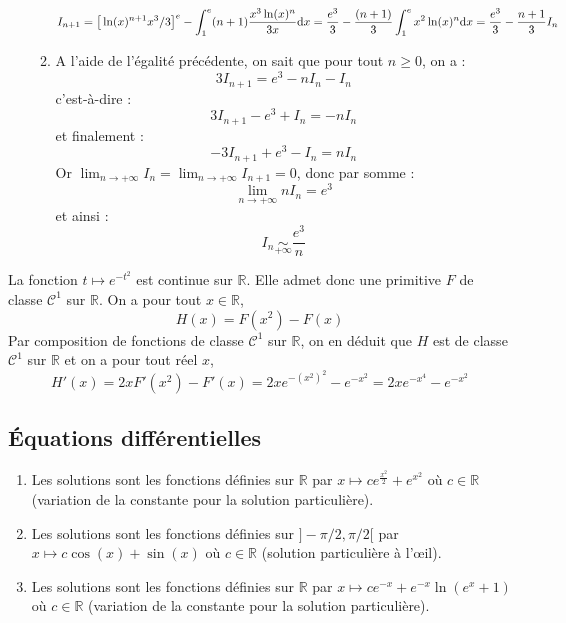 \documentclass[a4paper,twoside,french,11pt]{VcCours}
\newcommand{\dx}{\text{d}x}
\begin{document}
\begin{enumerate}
\begin{enumerate}
\[ I_{n+1}=\big{[}\ln (x)^{n+1} x^{3}/3 \big{]}^{e}-\int_{1}^{e}(n+1){\frac{x^{3}\ln (x)^{n}
}{3x}}\dx={\frac{e^{3}}{3}}-{\frac{(n+1)}{3}}\int_{1}^{e}x^{2}\ln (x)^{n}\dx=
{\frac{e^{3}}{3}}-{\frac{n+1}{3}}I_{n}
\]
\item A l'aide de l'égalité précédente, on sait que pour tout $n \geq 0$, on a :
\[ 3I_{n+1}=e^3-nI_n - I_n \]
c'est-à-dire :
\[ 3I_{n+1} -e^3 + I_n  = -nI_n \]
et finalement :
\[ -3I_{n+1}+e^3-I_n = n I_n \]
Or $  \lim_{n \rightarrow + \infty} I_n = \lim_{n \rightarrow + \infty} I_{n+1} = 0$, donc par somme :
\[ \lim\limits_{n\rightarrow +\infty }nI_{n}=e^{3}\]
et ainsi :
$$ I_n \underset{+ \infty}{\sim} \dfrac{e^3}{n}$$
\end{enumerate}
\end{enumerate}

\begin{Exercice}{}\end{Exercice}La fonction $t \mapsto e^{-t^2}$ est continue sur $\mathbb{R}$. Elle admet donc une primitive $F$ de classe $\mathcal{C}^1$ sur $\mathbb{R}$. On a pour tout $x \in \mathbb{R}$,
$$ H(x) = F(x^2)- F(x)$$
Par composition de fonctions de classe $\mathcal{C}^1$ sur $\mathbb{R}$, on en déduit que $H$ est de classe $\mathcal{C}^1$ sur $\mathbb{R}$ et on a pour tout réel $x$,
$$ H'(x) = 2x F'(x^2)-F'(x) = 2x e^{-(x^2)^2} - e^{-x^2} = 2x e^{-x^4} - e^{-x^2}$$





\subsection{Équations différentielles}

%
%

\begin{Exercice}{}\end{Exercice}
\begin{enumerate}
\item Les solutions sont les fonctions définies sur $\mathbb{R}$ par $x \mapsto ce^{\frac{x^2}{2}}+e^{x^2}$ où $c \in \mathbb{R}$ (variation de la constante pour la solution particulière).
\item Les solutions sont les fonctions définies sur $]-\pi/2, \pi/2[$ par $x \mapsto c \cos(x)+\sin(x)$ où $c \in \mathbb{R}$ (solution particulière à l'\oe{}il).
\item Les solutions sont les fonctions définies sur $\mathbb{R}$ par $x \mapsto c e^{-x}+ e^{-x}\ln(e^x+1)$ où $c \in \mathbb{R}$ (variation de la constante pour la solution particulière).
\end{enumerate}
\end{document}
